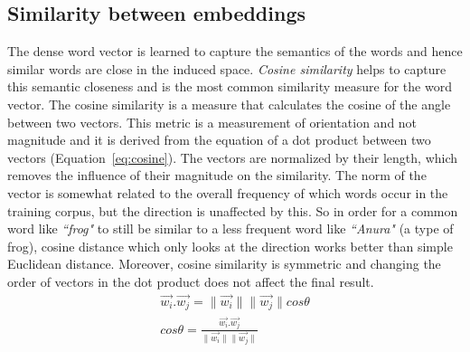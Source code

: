 \subsection{Similarity between embeddings}\label{sec:similarity}
The dense word vector is learned to capture the semantics of the words and hence similar words are close in the induced space. \emph{Cosine similarity} helps to capture this semantic closeness and is the most common similarity measure for the word vector. The cosine similarity is a measure that calculates the cosine of the angle between two vectors. This metric is a measurement of orientation and not magnitude and it is derived from the equation of a dot product between two vectors (Equation~\ref{eq:cosine}). The vectors are normalized by their length, which removes the influence of their magnitude on the similarity. The norm of the vector is somewhat related to the overall frequency of which words occur in the training corpus, but the direction is unaffected by this. So in order for a common word like \emph{``frog"} to still be similar to a less frequent word like \emph{``Anura"} (a type of frog), cosine distance which only looks at the direction works better than simple Euclidean distance. Moreover, cosine similarity is symmetric and changing the order of vectors in the dot product does not affect the final result.
\begin{equation}
\begin{split}
\overrightarrow { w_i } .\overrightarrow { w_j } =\parallel \overrightarrow { w_i } \parallel \parallel \overrightarrow { w_j } \parallel cos\theta 
\\
cos\theta =\frac { \overrightarrow { w_i } .\overrightarrow { w_j }  }{ \parallel \overrightarrow { w_i } \parallel \parallel \overrightarrow { w_j } \parallel  } 
\end{split}
\label{eq:cosine}
\end{equation}
